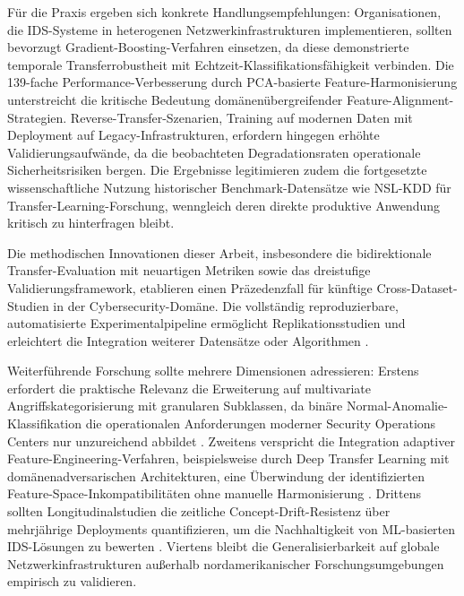 \documentclass[11pt,a4paper]{article}
\begin{document}
    Für die Praxis ergeben sich konkrete Handlungsempfehlungen: Organisationen, die IDS-Systeme in heterogenen Netzwerkinfrastrukturen implementieren, sollten bevorzugt Gradient-Boosting-Verfahren einsetzen, da diese demonstrierte temporale Transferrobustheit mit Echtzeit-Klassifikationsfähigkeit verbinden. Die 139-fache Performance-Verbesserung durch PCA-basierte Feature-Harmonisierung unterstreicht die kritische Bedeutung domänenübergreifender Feature-Alignment-Strategien. Reverse-Transfer-Szenarien, Training auf modernen Daten mit Deployment auf Legacy-Infrastrukturen, erfordern hingegen erhöhte Validierungsaufwände, da die beobachteten Degradationsraten operationale Sicherheitsrisiken bergen. Die Ergebnisse legitimieren zudem die fortgesetzte wissenschaftliche Nutzung historischer Benchmark-Datensätze wie NSL-KDD für Transfer-Learning-Forschung, wenngleich deren direkte produktive Anwendung kritisch zu hinterfragen bleibt.

    Die methodischen Innovationen dieser Arbeit, insbesondere die bidirektionale Transfer-Evaluation mit neuartigen Metriken sowie das dreistufige Validierungsframework, etablieren einen Präzedenzfall für künftige Cross-Dataset-Studien in der Cybersecurity-Domäne. Die vollständig reproduzierbare, automatisierte Experimentalpipeline ermöglicht Replikationsstudien und erleichtert die Integration weiterer Datensätze oder Algorithmen \parencite{Weirauch2025}.

    Weiterführende Forschung sollte mehrere Dimensionen adressieren: Erstens erfordert die praktische Relevanz die Erweiterung auf multivariate Angriffskategorisierung mit granularen Subklassen, da binäre Normal-Anomalie-Klassifikation die operationalen Anforderungen moderner Security Operations Centers nur unzureichend abbildet \parencite{Vinayakumar2019}. Zweitens verspricht die Integration adaptiver Feature-Engineering-Verfahren, beispielsweise durch Deep Transfer Learning mit domänenadversarischen Architekturen, eine Überwindung der identifizierten Feature-Space-Inkompatibilitäten ohne manuelle Harmonisierung \parencite{Goodfellow2016}. Drittens sollten Longitudinalstudien die zeitliche Concept-Drift-Resistenz über mehrjährige Deployments quantifizieren, um die Nachhaltigkeit von ML-basierten IDS-Lösungen zu bewerten \parencite{Ring2019}. Viertens bleibt die Generalisierbarkeit auf globale Netzwerkinfrastrukturen außerhalb nordamerikanischer Forschungsumgebungen empirisch zu validieren.
\end{document}
